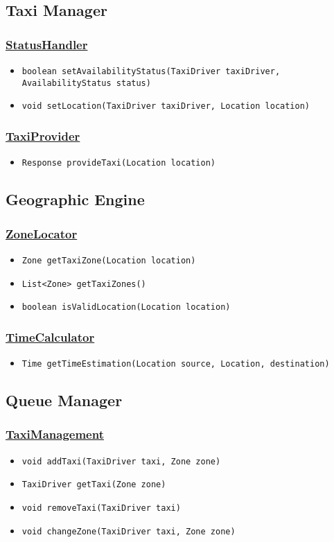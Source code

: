 \subsection{Taxi Manager}
\subsubsection{\underline{StatusHandler}}
\begin{itemize}
	\item \texttt{boolean setAvailabilityStatus(TaxiDriver taxiDriver, AvailabilityStatus status)}
	\item \texttt{void setLocation(TaxiDriver taxiDriver, Location location)}
\end{itemize}
\subsubsection{\underline{TaxiProvider}}
\begin{itemize}
	\item \texttt{Response provideTaxi(Location location)}
\end{itemize}
\subsection{Geographic Engine}
\subsubsection{\underline{ZoneLocator}}
\begin{itemize}
	\item \texttt{Zone getTaxiZone(Location location)}
	\item \texttt{List<Zone> getTaxiZones()}
	\item \texttt{boolean isValidLocation(Location location)}
\end{itemize}
\subsubsection{\underline{TimeCalculator}}
\begin{itemize}
	\item \texttt{Time getTimeEstimation(Location source, Location, destination)}
\end{itemize}
\subsection{Queue Manager}
\subsubsection{\underline{TaxiManagement}}
\begin{itemize}
	\item \texttt{void addTaxi(TaxiDriver taxi, Zone zone)}
	\item \texttt{TaxiDriver getTaxi(Zone zone)}
	\item \texttt{void removeTaxi(TaxiDriver taxi)}
	\item \texttt{void changeZone(TaxiDriver taxi, Zone zone)}
\end{itemize}